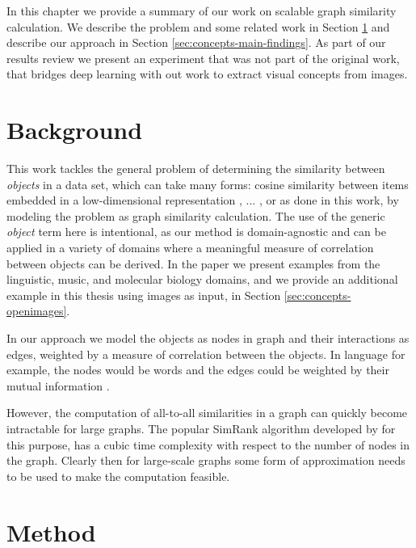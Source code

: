 In this chapter we provide a summary of our work on scalable graph similarity calculation.
We describe the problem and some related work in Section \ref{sec:concepts-background}
and describe our approach in Section \ref{sec:concepts-main-findings}. As part of our
results review we present an experiment that was not part of the original work, that
bridges deep learning with out work to extract visual concepts from images.


\section{Background}

\label{sec:concepts-background}

This work tackles the general problem of determining the similarity between \emph{objects}
in a data set, which can take many forms: cosine similarity between
items embedded in a low-dimensional representation \cite{word2vec}, ...
, or as done
in this work, by modeling the problem as graph similarity calculation.
The use of the generic \emph{object} term here is intentional, as our method is domain-agnostic
and can be applied in a variety of domains where a meaningful measure of correlation
between objects can be derived. In the paper we present examples from the linguistic,
music, and molecular biology domains, and we provide an additional example in this thesis
using images as input, in Section \ref{sec:concepts-openimages}.

In our approach we model the objects as nodes in graph and their interactions as edges,
weighted by a measure of correlation between the objects. In language for example, the
nodes would be words and the edges could be weighted by their mutual information \cite{mutual-information-nlp}.

However, the computation of all-to-all similarities in a graph can quickly become
intractable for large graphs. The popular SimRank algorithm developed by
\citet{simrank} for this purpose,
has a cubic time complexity with respect to the number of nodes in the graph.
Clearly then for large-scale graphs some form of approximation needs to be used
to make the computation feasible.


\section{Method}

